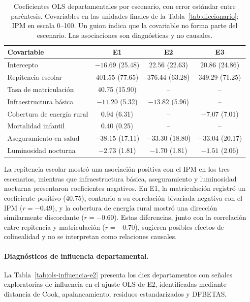 \begin{table}[!htbp]
\centering
\footnotesize
\caption{Coeficientes OLS departamentales por escenario, con error estándar entre paréntesis. Covariables en las unidades finales de la Tabla~\ref{tab:diccionario}; IPM en escala 0--100. Un guion indica que la covariable no forma parte del escenario. Las asociaciones son diagnósticas y no causales.}
\label{tab:ols-coeficientes}
\renewcommand{\arraystretch}{1.2}
\begin{tabular}{l c c c}
\hline
Covariable & E1 & E2 & E3 \\
\hline
Intercepto & $-16.69$ (25.48) & 22.56 (22.63) & 20.86 (24.86) \\
Repitencia escolar & 401.55 (77.65) & 376.44 (63.28) & 349.29 (71.25) \\
Tasa de matriculación & 40.75 (15.90) & -- & -- \\
Infraestructura básica & $-11.20$ (5.32) & $-13.82$ (5.96) & -- \\
Cobertura de energía rural & 0.94 (6.31) & -- & $-7.07$ (7.01) \\
Mortalidad infantil & 0.40 (0.25) & -- & -- \\
Aseguramiento en salud & $-38.15$ (17.11) & $-33.30$ (18.80) & $-33.04$ (20.17) \\
Luminosidad nocturna & $-2.73$ (1.81) & $-1.70$ (1.81) & $-1.51$ (2.06) \\
\hline
\end{tabular}
\end{table}

La repitencia escolar mostró una asociación positiva con el IPM en los tres escenarios, mientras que infraestructura básica, aseguramiento y luminosidad nocturna presentaron coeficientes negativos. En E1, la matriculación registró un coeficiente positivo (40.75), contrario a su correlación bivariada negativa con el IPM ($r=-0.49$), y la cobertura de energía rural mostró una dirección similarmente discordante ($r=-0.60$). Estas diferencias, junto con la correlación entre repitencia y matriculación ($r=-0.70$), sugieren posibles efectos de colinealidad y no se interpretan como relaciones causales.

\paragraph{Diagnósticos de influencia departamental.}

La Tabla~\ref{tab:ols-influencia-e2} presenta los diez departamentos con señales exploratorias de influencia en el ajuste OLS de E2, identificadas mediante distancia de Cook, apalancamiento, residuos estandarizados y DFBETAS.

